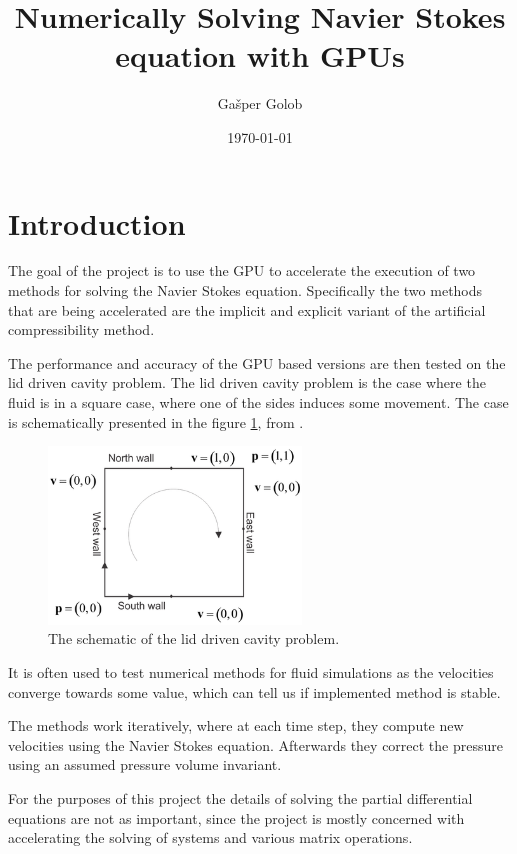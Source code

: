 \documentclass{article}
\title{Numerically Solving Navier Stokes equation with GPUs}
\author{Gašper Golob}
\date{\today}
\begin{document}
\maketitle

\section{Introduction}
The goal of the project is to use the GPU to accelerate the execution of two methods for 
solving the Navier Stokes equation. Specifically the two methods that are being accelerated are
the implicit and explicit variant of the artificial compressibility method.

The performance and accuracy of the GPU based versions are then tested on the 
lid driven cavity problem. The lid driven cavity problem is the case where the fluid is in 
a square case, where one of the sides induces some movement. 
The case is schematically presented in the figure \ref{fig:lid_driven_cavity}, 
from \cite{lidDriven}.
\begin{figure}[h!] 
    \centering 
    \includegraphics[width=0.6\textwidth]{lid_driven_cavity.png} 
    \caption{The schematic of the lid driven cavity problem.} 
    \label{fig:lid_driven_cavity} 
\end{figure}
It is often used to test numerical methods for fluid simulations as the velocities converge towards 
some value, which can tell us if implemented method is stable.

The methods work iteratively, where at each time step, they compute new velocities using the 
Navier Stokes equation. Afterwards they correct the pressure using an assumed pressure volume 
invariant. 

For the purposes of this project the details of solving the partial differential equations are not 
as important, since the project is mostly concerned with accelerating the solving of systems and 
various matrix operations.
\end{document}
